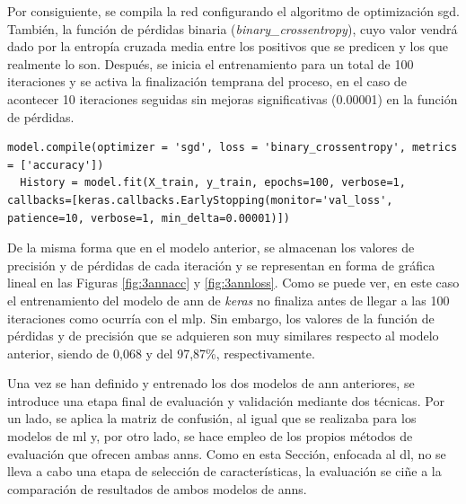 \vspace{3mm}

Por consiguiente, se compila la red configurando el algoritmo de optimización \gls{sgd}. También, la función de pérdidas binaria (\textit{binary\_crossentropy}), cuyo valor vendrá dado por la entropía cruzada media entre los positivos que se predicen y los que realmente lo son. Después, se inicia el entrenamiento para un total de 100 iteraciones y se activa la finalización temprana \cite{early} del proceso, en el caso de acontecer 10 iteraciones seguidas sin mejoras significativas (0.00001) en la función de pérdidas. 

\vspace{3mm}

\begin{lstlisting}[style=Python, caption={Entrenamiento del modelo de ANN de Keras}]
  model.compile(optimizer = 'sgd', loss = 'binary_crossentropy', metrics = ['accuracy'])
  History = model.fit(X_train, y_train, epochs=100, verbose=1, callbacks=[keras.callbacks.EarlyStopping(monitor='val_loss', patience=10, verbose=1, min_delta=0.00001)])
\end{lstlisting}

\vspace{3mm}

De la misma forma que en el modelo anterior, se almacenan los valores de precisión y de pérdidas de cada iteración y se representan en forma de gráfica lineal en las Figuras \ref{fig:3annacc} y \ref{fig:3annloss}. Como se puede ver, en este caso el entrenamiento del modelo de \gls{ann} de \textit{keras} no finaliza antes de llegar a las 100 iteraciones como ocurría con el \gls{mlp}. Sin embargo, los valores de la función de pérdidas y de precisión que se adquieren son muy similares respecto al modelo anterior, siendo de 0,068 y del 97,87\%, respectivamente. 

\vspace{3mm}

Una vez se han definido y entrenado los dos modelos de \gls{ann} anteriores, se introduce una etapa final de evaluación y validación mediante dos técnicas. Por un lado, se aplica la matriz de confusión, al igual que se realizaba para los modelos de \gls{ml} y, por otro lado, se hace empleo de los propios métodos de evaluación que ofrecen ambas \gls{ann}s. Como en esta Sección, enfocada al \gls{dl}, no se lleva a cabo una etapa de selección de características, la evaluación se ciñe a la comparación de resultados de ambos modelos de \gls{ann}s. 

